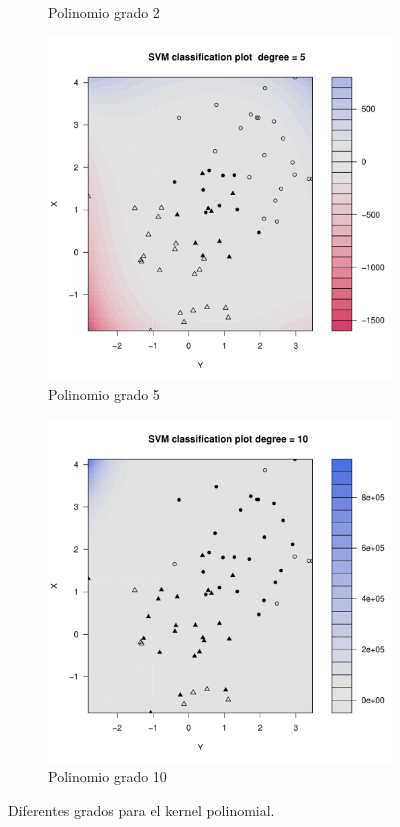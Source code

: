 \begin{figure}[H]
\begin{subfigure}{0.24\linewidth}
		\caption{Polinomio grado 2}
	\end{subfigure}
	\begin{subfigure}{0.24\linewidth}
		\includegraphics[width=1\linewidth]{Graphics/Problema_01/Experiment_02_3.pdf}
		\caption{Polinomio grado 5}
	\end{subfigure}
	\begin{subfigure}{0.24\linewidth}
		\includegraphics[width=1\linewidth]{Graphics/Problema_01/Experiment_02_4.pdf}
		\caption{Polinomio grado 10}
	\end{subfigure}
	\caption{Diferentes grados para el kernel polinomial.}
	\label{fig:experimento_2}
\end{figure}

